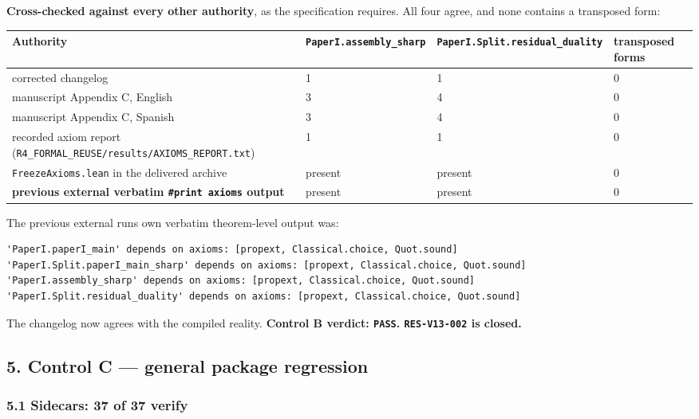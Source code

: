 \documentclass[
  9pt,
  a4paper,
]{article}
\newcounter{none} %
\begin{document}
\textbf{Cross-checked against every other authority}, as the
specification requires. All four agree, and none contains a transposed
form:

{\def\LTcaptype{none} %
\begin{longtable}[]{@{}llll@{}}
\toprule\noalign{}
Authority & \texttt{PaperI.assembly\_sharp} &
\texttt{PaperI.Split.residual\_duality} & transposed forms \\
\midrule\noalign{}
\endhead
\bottomrule\noalign{}
\endlastfoot
corrected changelog & 1 & 1 & 0 \\
manuscript Appendix C, English & 3 & 4 & 0 \\
manuscript Appendix C, Spanish & 3 & 4 & 0 \\
recorded axiom report
(\texttt{R4\_FORMAL\_REUSE/results/AXIOMS\_REPORT.txt}) & 1 & 1 & 0 \\
\texttt{FreezeAxioms.lean} in the delivered archive & present & present
& 0 \\
\textbf{previous external verbatim \texttt{\#print\ axioms} output} &
present & present & 0 \\
\end{longtable}
}

The previous external run\textquotesingle s own verbatim theorem-level
output was:

\begin{verbatim}
'PaperI.paperI_main' depends on axioms: [propext, Classical.choice, Quot.sound]
'PaperI.Split.paperI_main_sharp' depends on axioms: [propext, Classical.choice, Quot.sound]
'PaperI.assembly_sharp' depends on axioms: [propext, Classical.choice, Quot.sound]
'PaperI.Split.residual_duality' depends on axioms: [propext, Classical.choice, Quot.sound]
\end{verbatim}

The changelog now agrees with the compiled reality. \textbf{Control B
verdict: \texttt{PASS}. \texttt{RES-V13-002} is closed.}

\subsection{5. Control C --- general package
regression}\label{5-control-c--general-package-regression}

\subsubsection{5.1 Sidecars: 37 of 37
verify}\label{51-sidecars-37-of-37-verify}
\end{document}
